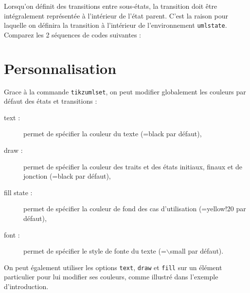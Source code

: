 \documentclass[a4paper,11pt]{report}
\newcommand{\inputTikZ}[1]{%
  }%
\newcommand{\inputTikZ}[1]{%
    \texttt{[image: fig/\#1.pdf]}%
  }%
\begin{document}
Lorsqu'on définit des transitions entre sous-états, la transition doit être intégralement représentée à l'intérieur de l'état parent. C'est la raison pour laquelle on définira la transition à l'intérieur de l'environnement {\tt umlstate}. Comparez les 2 séquences de codes suivantes :

\medskip

\begin{minipage}{0.51\textwidth}

\end{minipage}
\begin{minipage}{0.49\textwidth}
\begin{center}
\inputTikZ{transitioninnerbug}
\end{center}
\end{minipage}

\begin{minipage}{0.51\textwidth}

\end{minipage}
\begin{minipage}{0.49\textwidth}
\begin{center}
\inputTikZ{transitioninner}
\end{center}
\end{minipage}

\section{Personnalisation}\label{s.fitstatetrans}

Grace à la commande {\tt tikzumlset}, on peut modifier globalement les couleurs par défaut des états et transitions :

\begin{description}
\item[text :] permet de spécifier la couleur du texte (=black par défaut),
\item[draw :] permet de spécifier la couleur des traits et des états initiaux, finaux et de jonction (=black par défaut),
\item[fill state :] permet de spécifier la couleur de fond des cas d'utilisation (=yellow!20 par défaut),
\item[font :] permet de spécifier le style de fonte du texte (=$\backslash$small par défaut).
\end{description}

On peut également utiliser les options {\tt text}, {\tt draw} et {\tt fill} sur un élément particulier pour lui modifier ses couleurs, comme illustré dans l'exemple d'introduction.
\end{document}
